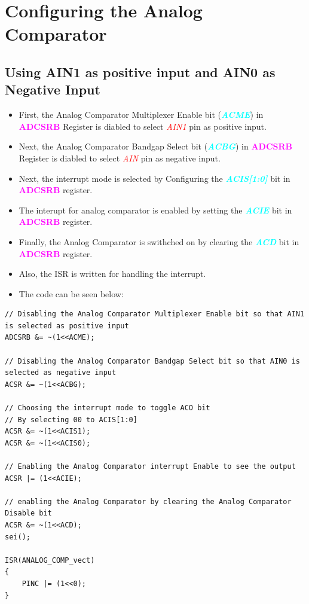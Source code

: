 \documentclass{article}
\newcommand{\bitFormat}[1]{\emph{\textbf{\textcolor{cyan}{#1}}}}
\newcommand{\regFormat}[1]{\textbf{\textcolor{magenta}{#1}}}
\newcommand{\pinFormat}[1]{\emph{\textcolor{red}{#1}}}
\begin{document}
\section{Configuring the Analog Comparator}
\subsection{Using AIN1 as positive input and AIN0 as Negative Input}
\begin{itemize}
    \item First, the Analog Comparator Multiplexer Enable bit (\bitFormat{ACME}) in \regFormat{ADCSRB} Register is diabled to select \pinFormat{AIN1} pin as positive input.
    \item Next, the Analog Comparator Bandgap Select bit (\bitFormat{ACBG}) in \regFormat{ADCSRB} Register is diabled to select \pinFormat{AIN} pin as negative input.
    \item Next, the interrupt mode is selected by Configuring the \bitFormat{ACIS[1:0]} bit in \regFormat{ADCSRB} register.
    \item The interupt for analog comparator is enabled by setting the \bitFormat{ACIE} bit in \regFormat{ADCSRB} register.
    \item Finally, the Analog Comparator is swithched on by clearing the \bitFormat{ACD} bit in \regFormat{ADCSRB} register.
    \item Also, the ISR is written for handling the interrupt.
    \item The code can be seen below:
\end{itemize}

\begin{verbatim}
// Disabling the Analog Comparator Multiplexer Enable bit so that AIN1 is selected as positive input
ADCSRB &= ~(1<<ACME);

// Disabling the Analog Comparator Bandgap Select bit so that AIN0 is selected as negative input
ACSR &= ~(1<<ACBG);

// Choosing the interrupt mode to toggle ACO bit 
// By selecting 00 to ACIS[1:0]
ACSR &= ~(1<<ACIS1);
ACSR &= ~(1<<ACIS0);

// Enabling the Analog Comparator interrupt Enable to see the output
ACSR |= (1<<ACIE);

// enabling the Analog Comparator by clearing the Analog Comparator Disable bit
ACSR &= ~(1<<ACD);
sei();

ISR(ANALOG_COMP_vect)
{
    PINC |= (1<<0);
}
\end{verbatim}
\end{document}
